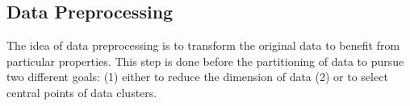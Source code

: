 \subsection{Data Preprocessing}\label{data_preprocessing}
The idea of data preprocessing is to transform the original data to benefit from particular properties. This step is 
done before the partitioning of data to pursue two different goals: (1) either to reduce the dimension of data (2) or 
to select central points of data clusters. 


